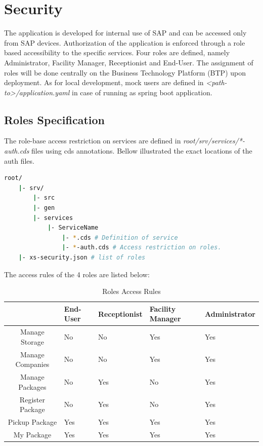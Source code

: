 \section{Security}
The application is developed for internal use of SAP and can be accessed only from SAP devices. 
Authorization of the application is enforced through a role based accessibility to the specific services. Four roles are defined, namely Administrator, Facility Manager, Receptionist and End-User. The assignment of roles will be done centrally on the Business Technology Platform (BTP) upon deployment. As for local development, mock users are defined in \textit{<path-to>/application.yaml} in case of running as spring boot application.

\subsection{Roles Specification}
The role-base access restriction on services are defined in \textit{root/srv/services/*-auth.cds} files using cds annotations. Bellow illustrated the exact locations of the auth files.

\begin{lstlisting}[language={bash}]
root/
    |- srv/
        |- src
        |- gen
        |- services
            |- ServiceName 
                |- *.cds # Definition of service
                |- *-auth.cds # Access restriction on roles.
    |- xs-security.json # list of roles
\end{lstlisting}

The access rules of the 4 roles are listed below:

\begin{table}[H]
    \centering
    \begin{tabular}{|c|m{2.1cm}|m{2.1cm}|m{2.1cm}|m{2.5cm}|} \hline 
         & End-User & Receptionist & Facility Manager & Administrator     \\ \hline 
         Manage Storage          & No & No & Yes & Yes \\ \hline 
         Manage Companies         & No & No & Yes & Yes \\ \hline 
         Manage Packages          & No & Yes & No  & Yes \\ \hline 
         Register Package       & No & Yes & No  & Yes \\ \hline 
         Pickup Package           & Yes & Yes & Yes & Yes \\ \hline
         My Package               & Yes & Yes & Yes & Yes \\ \hline
    \end{tabular}
    \caption{Roles Access Rules}
    \label{tab:Access Rule}
\end{table}
